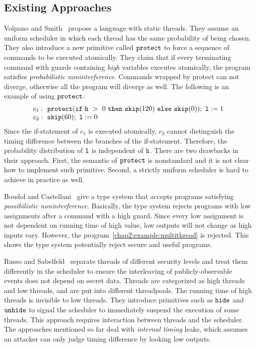 \documentclass{report}
\newcommand{\co}[1]{$\cod{#1}$}
\begin{document}
\subsection{Existing Approaches}
\label{chap2:multithreaded:approach}
Volpano and Smith~\cite{Volpano:Smith:Probabilistic} propose a language
with static threads. They assume an uniform scheduler in which
each thread has the same probability of being chosen. They also
introduce a new primitive called $\mathtt{protect}$ to force a sequence of commands
to be executed atomically. They claim that if every terminating command with guards containing
{\it high} variables executes atomically, the program satisfies {\em probabilistic
noninterference}. Commands wrapped by protect can not diverge, otherwise all the program
will diverge as well.
The following is an example of using $\mathtt{protect}$:
\begin{equation}
 \begin{array}{l}
c_1:~\cod{protect}(\ifthenelse{\cod{h}~>~0}{\cod{skip}(120)}{\cod{skip}(0)});~\cod{l}:=1 \\
c_2:~\cod{skip}(60);~\cod{l}:=0
 \end{array}
\label{chap2:example:protect}
\end{equation}
Since the if-statement of $c_1$ is executed atomically, $c_2$ cannot
distinguish the timing difference between the branches of the if-statement.
Therefore, the probability distribution of $\mathtt{l}$ is independent of $\mathtt{h}$.
There are two drawbacks in their approach.
First, the semantic of \co{protect} is nonstandard and it is
not clear how to implement such primitive. Second, a strictly uniform scheduler 
is hard to achieve in practice as well.

Boudol and Castellani~\cite{Castellani:Boudol:TCS02} give a type system that
accepts programs satisfying {\em possibilistic noninterference}.
Basically, the type system rejects programs with low assignments after a command
with a high guard. Since every
low assignment is not dependent on running time of high value, low outputs 
will not change as high inputs vary. However, the program~\ref{chap2:example:multithread}
is rejected.
This shows the type system potentially reject secure and useful programs.

Russo and Sabelfeld~\cite{Russo:Sabelfeld:CSFW06} separate threads of 
different security levels and treat them differently in the scheduler 
to ensure the interleaving of publicly-observable events does not 
depend on secret data. Threads are categorized as high threads 
and low threads, and are put into different threadpools. The running time 
of high threads is invisible to low threads. They introduce primitives such 
as $\mathtt{hide}$ and $\mathtt{unhide}$ to signal the scheduler 
to immediately suspend the execution of some threads. This
approach requires interaction between threads and the scheduler.
The approaches mentioned so far deal with {\em internal timing} leaks, which
assumes an attacker can only judge timing difference by looking
low outputs.
\end{document}
